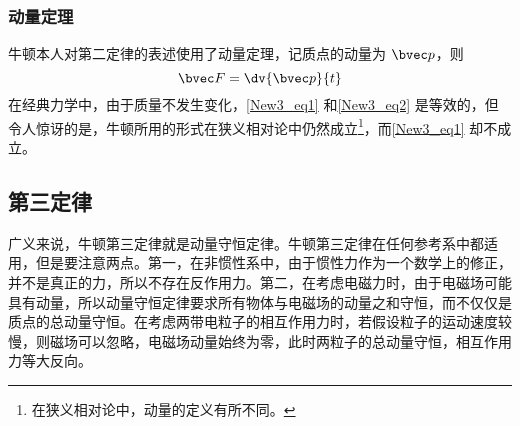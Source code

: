 \subsubsection{动量定理}
牛顿本人对第二定律的表述使用了动量定理，记质点的动量为 $\bvec p$，则
\begin{equation}\label{New3_eq2}
\bvec F = \dv{\bvec p}{t}
\end{equation}
在经典力学中，由于质量不发生变化，\autoref{New3_eq1} 和\autoref{New3_eq2} 是等效的，但令人惊讶的是，牛顿所用的形式在狭义相对论中仍然成立\footnote{在狭义相对论中，动量的定义有所不同。}，而\autoref{New3_eq1} 却不成立。

\subsection{第三定律}
广义来说，牛顿第三定律就是动量守恒定律。牛顿第三定律在任何参考系中都适用，但是要注意两点。第一，在非惯性系中，由于惯性力作为一个数学上的修正，并不是真正的力，所以不存在反作用力。第二，在考虑电磁力时，由于电磁场可能具有动量，所以动量守恒定律要求所有物体与电磁场的动量之和守恒，而不仅仅是质点的总动量守恒。在考虑两带电粒子的相互作用力时，若假设粒子的运动速度较慢，则磁场可以忽略，电磁场动量始终为零，此时两粒子的总动量守恒，相互作用力等大反向。
